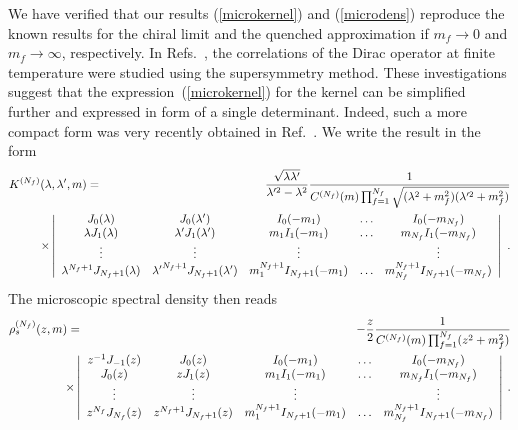 We have verified that our results (\ref{microkernel}) and
(\ref{microdens}) reproduce the known results for the chiral limit and
the quenched approximation if $m_f\to 0$ and $m_f\to\infty$,
respectively.  In Refs.~\cite{Guhr97a,Jack97a}, the correlations of
the Dirac operator at finite temperature were studied using the
supersymmetry method. These investigations suggest that the
expression~(\ref{microkernel}) for the kernel can be simplified
further and expressed in form of a single determinant.
Indeed, such a more compact form was very recently obtained in
Ref.~\cite{Damg97}.  We write the result in the form
\begin{eqnarray}
K^{(N_f)}(\lambda,\lambda^\prime,m) & = &  
  \frac{\sqrt{\lambda\lambda^\prime}}{\lambda^{\prime 2}-\lambda^2}
  \frac{1}{C^{(N_f)}(m)\prod_{f=1}^{N_f}\sqrt{(\lambda^2+m_f^2)
      (\lambda^{\prime 2}+m_f^2)}}
  \nonumber \\ & & \hspace*{-60pt}\times
\left|\begin{array}{ccccc}
J_0(\lambda) & J_0(\lambda^\prime) & I_0(-m_1) & \ldots & I_0(-m_{N_f}) \\
\lambda J_1(\lambda) & \lambda^\prime J_1(\lambda^\prime) & 
  m_1I_1(-m_1) & \ldots & m_{N_f}I_1(-m_{N_f}) \\
\vdots & \vdots & \vdots & & \vdots \\
\lambda^{N_f+1} J_{N_f+1}(\lambda) & 
  {\lambda^\prime}^{N_f+1} J_{N_f+1}(\lambda^\prime) & 
  m_1^{N_f+1}I_{N_f+1}(-m_1) & \ldots & 
  m_{N_f}^{N_f+1}I_{N_f+1}(-m_{N_f}) 
\end{array}\right| \ .
\label{darmnij}
\end{eqnarray}
The microscopic spectral density then reads
\begin{eqnarray}
\rho_s^{(N_f)}(z,m) & = &  
  -\frac{z}{2}
  \frac{1}{C^{(N_f)}(m)\prod_{f=1}^{N_f}(z^2+m_f^2)}\nonumber \\ 
  & & \hspace*{-22pt}\times
\left|\begin{array}{ccccc}
  z^{-1}J_{-1}(z) & J_0(z) & I_0(-m_1) & \ldots & I_0(-m_{N_f}) \\
  J_0(z) & z J_1(z) & 
  m_1I_1(-m_1) & \ldots & m_{N_f}I_1(-m_{N_f}) \\
  \vdots & \vdots & \vdots & & \vdots \\
  z^{N_f} J_{N_f}(z) & 
  z^{N_f+1} J_{N_f+1}(z) & 
  m_1^{N_f+1}I_{N_f+1}(-m_1) & \ldots & 
  m_{N_f}^{N_f+1}I_{N_f+1}(-m_{N_f}) 
\end{array}\right|\:.
\label{mdDN}
\end{eqnarray}
